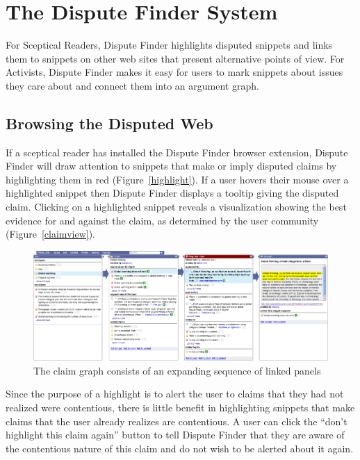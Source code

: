 \documentclass{www2010-submission}
\begin{document}
\section{The Dispute Finder System}

For Sceptical Readers, Dispute Finder highlights disputed snippets and links them to snippets on other web sites that present alternative points of view. For Activists, Dispute Finder makes it easy for users to mark snippets about issues they care about and connect them into an argument graph.

\subsection{Browsing the Disputed Web}

If a sceptical reader has installed the Dispute Finder browser extension, Dispute Finder will draw attention to snippets that make or imply disputed claims by highlighting them in red (Figure~\ref{highlight}). If a user hovers their mouse over a highlighted snippet then Dispute Finder displays a tooltip giving the disputed claim. Clicking on a highlighted snippet reveals a visualization showing the best evidence for and against the claim, as determined by the user community (Figure~\ref{claimview}).

\begin{figure}[tb]
	\begin{center}
	\includegraphics[width=18cm]{../screenshots/v2_panels2.png}
	\caption{The claim graph consists of an expanding sequence of linked panels}
	\label{panels}
	\end{center}
\end{figure}

Since the purpose of a highlight is to alert the user to claims that they had not realized were contentious, there is little benefit in highlighting snippets that make claims that the user already realizes are contentious. A user can click the ``don't highlight this claim again'' button to tell Dispute Finder that they are aware of the contentious nature of this claim and do not wish to be alerted about it again.
\end{document}
